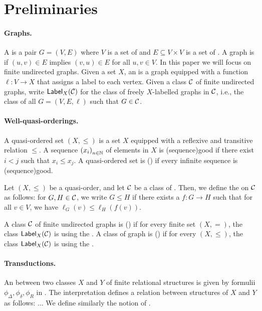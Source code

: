 \section{Preliminaries}
\label{sec:preliminaries}

\paragraph*{Graphs.} A  is a pair $G = (V, E)$ where $V$ is a set
of  and $E \subseteq V \times V$ is a set of . A
graph is  if $(u, v) \in E$ implies $(v, u) \in E$ for all
$u, v \in V$. In this paper we will focus on finite undirected graphs. Given a
set $X$, an  is a graph equipped with a function
$\ell \colon V \to X$ that assigns a label to each vertex. Given a class $\mathcal{C}$
of finite undirected graphs, write $\mathsf{Label}_{X}(\mathcal{C})$ for the class of freely
$X$-labelled graphs in $\mathcal{C}$, i.e., the class of all 
$G = (V, E, \ell)$ such that $G \in \mathcal{C}$.


\paragraph*{Well-quasi-orderings.} A quasi-ordered set $(X, \leq)$ is a set $X$
equipped with a reflexive and transitive relation $\leq$. A sequence
$\seqof{x_i}$ of elements in $X$ is \intro(sequence){good} if there exist $i <
j$ such that $x_i \leq x_j$. A quasi-ordered set is 
() if every infinite sequence is \kl(sequence){good}.

\AP
Let $(X, \leq)$ be a quasi-order, and let $\mathcal{C}$ be a class of . Then, we define the  on $\mathcal{C}$ as
follows: for $G, H \in \mathcal{C}$, we write $G \leq H$ if there exists a
 $f \colon G \to H$ such that for all $v \in V$, we have
$\ell_G(v) \leq \ell_H(f(v))$. 

\AP A class $\mathcal{C}$ of finite undirected graphs is
 () if for every
finite set $(X,=)$, the class $\mathsf{Label}_{X}(\mathcal{C})$ is 
using the . A class of graph is
 () if for every
 $(X, \leq)$, the class $\mathsf{Label}_{X}(\mathcal{C})$ is
 using the .

\paragraph*{Transductions.} An  between two
classes $X$ and $Y$ of finite relational structures is given by formulii
$\phi_{\Delta}, \phi_{\delta}, \phi_{R}$ in .
The interpretation defines a relation between structures of $X$ and $Y$ as
follows: ... We define similarly the notion of .

